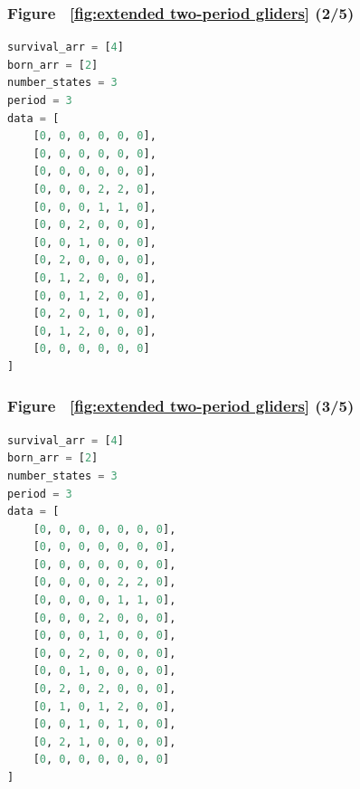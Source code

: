 \documentclass[12pt]{article}
\numberwithin{figure}{section} %
\begin{document}
\noindent\begin{minipage}{.45\textwidth}
\subsubsection{Figure ~\ref{fig:extended two-period gliders} (2/5)}
\label{subsubsection:extended two-period gliders(2/5)}
\begin{lstlisting}[language = Python]
survival_arr = [4]
born_arr = [2]
number_states = 3
period = 3
data = [
    [0, 0, 0, 0, 0, 0],
    [0, 0, 0, 0, 0, 0],
    [0, 0, 0, 0, 0, 0],
    [0, 0, 0, 2, 2, 0],
    [0, 0, 0, 1, 1, 0],
    [0, 0, 2, 0, 0, 0],
    [0, 0, 1, 0, 0, 0],
    [0, 2, 0, 0, 0, 0],
    [0, 1, 2, 0, 0, 0],
    [0, 0, 1, 2, 0, 0],
    [0, 2, 0, 1, 0, 0],
    [0, 1, 2, 0, 0, 0],
    [0, 0, 0, 0, 0, 0]
]
\end{lstlisting}
\end{minipage}\hfill
\begin{minipage}{.45\textwidth}
\subsubsection{Figure ~\ref{fig:extended two-period gliders} (3/5)}
\label{subsubsection:extended two-period gliders(3/5)}
\begin{lstlisting}[language = Python]
survival_arr = [4]
born_arr = [2]
number_states = 3
period = 3
data = [
    [0, 0, 0, 0, 0, 0, 0],
    [0, 0, 0, 0, 0, 0, 0],
    [0, 0, 0, 0, 0, 0, 0],
    [0, 0, 0, 0, 2, 2, 0],
    [0, 0, 0, 0, 1, 1, 0],
    [0, 0, 0, 2, 0, 0, 0],
    [0, 0, 0, 1, 0, 0, 0],
    [0, 0, 2, 0, 0, 0, 0],
    [0, 0, 1, 0, 0, 0, 0],
    [0, 2, 0, 2, 0, 0, 0],
    [0, 1, 0, 1, 2, 0, 0],
    [0, 0, 1, 0, 1, 0, 0],
    [0, 2, 1, 0, 0, 0, 0],
    [0, 0, 0, 0, 0, 0, 0]
]
\end{lstlisting}
\end{minipage}
\end{document}
